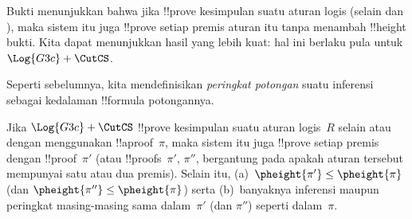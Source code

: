 \documentclass[../../../include/open-logic-section]{subfiles}
\begin{document}


Bukti  menunjukkan bahwa jika 
!!{prove} kesimpulan suatu aturan logis (selain \RightR{\lexists} dan
\LeftR{\lforall}), maka sistem itu juga !!{prove} setiap premis aturan itu
tanpa menambah !!{height} bukti. Kita dapat menunjukkan hasil yang lebih
kuat: hal ini berlaku pula untuk $\Log{G3c} + \CutCS$.

Seperti sebelumnya, kita mendefinisikan \emph{peringkat potongan} suatu
inferensi \CutCS{} sebagai kedalaman !!{formula} potongannya.

\begin{lem}
Jika $\Log{G3c} + \CutCS$ !!{prove} kesimpulan suatu aturan logis~$R$
selain \RightR{\lexists} atau \LeftR{\lforall} dengan menggunakan
!!a{proof}~$\pi$, maka sistem itu juga !!{prove} setiap premis dengan
!!{proof}~$\pi'$ (atau !!{proof}s~$\pi'$, $\pi''$, bergantung pada apakah
aturan tersebut mempunyai satu atau dua premis). Selain itu,
(a)~$\pheight{\pi'}\le\pheight{\pi}$ (dan
$\pheight{\pi''}\le\pheight{\pi}$) serta (b)~banyaknya inferensi \CutCS{}
maupun peringkat masing-masing sama dalam~$\pi'$ (dan $\pi''$) seperti
dalam~$\pi$.
\end{lem}
\end{document}
